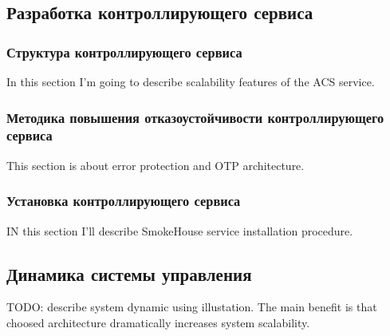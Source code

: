 \subsection{Разработка контроллирующего сервиса}

\subsubsection{Структура контроллирующего сервиса}
In this section I'm going to describe scalability features of the ACS service.

\subsubsection{Методика повышения отказоустойчивости контроллирующего сервиса}
This section is about error protection and OTP architecture.

\subsubsection{Установка контроллирующего сервиса}
IN this section I'll describe SmokeHouse service installation procedure.

\subsection{Динамика системы управления}
TODO: describe system dynamic using illustation. The main benefit is that choosed architecture
dramatically increases system scalability.
